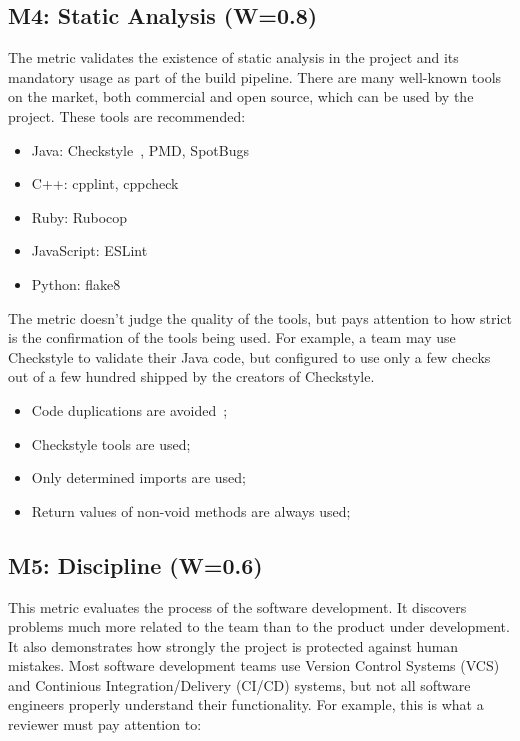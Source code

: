 \documentclass[12pt,oneside]{article}
\begin{document}
\subsection{M4: Static Analysis (W=0.8)}

The metric validates the existence of static analysis in the project
and its mandatory usage as part of the build pipeline.
There are many well-known tools on the market, both commercial and
open source, which can be used by the project. These tools are recommended:

\begin{itemize}
  \item Java: Checkstyle~\citep{checkstyle}, PMD, SpotBugs
  \item C++: cpplint, cppcheck
  \item Ruby: Rubocop~\citep{rubocop}
  \item JavaScript: ESLint
  \item Python: flake8
\end{itemize}

The metric doesn't judge the quality of the tools, but pays attention to how strict is the
confirmation of the tools being used. For example, a team may use Checkstyle
to validate their Java code, but configured to use only a few checks
out of a few hundred shipped by the creators of Checkstyle.

\begin{itemize}
  \item Code duplications are avoided~\citep[pp.39--40]{eo2};
  \item Checkstyle tools are used;
  \item Only determined imports are used;
  \item Return values of non-void methods are always used;
\end{itemize}

\subsection{M5: Discipline (W=0.6)}

This metric evaluates the process of the software
development. It discovers problems much more related to the team than
to the product under development. It also demonstrates how strongly the project is
protected against human mistakes. Most software development teams use
Version Control Systems (VCS) and Continious Integration/Delivery (CI/CD) systems, but not all
software engineers properly understand their functionality. For example, this is what
a reviewer must pay attention to:
\end{document}
